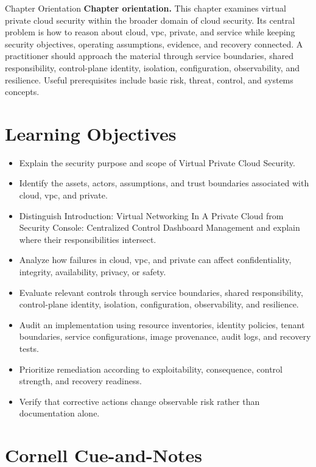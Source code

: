 \documentclass[11pt,letterpaper]{article}
\title{\CornellDocumentTitle}
\author{}
\date{}
\begin{document}
\maketitle
\begin{CornellOverviewBox}{Chapter Orientation}
\textbf{Chapter orientation.} This chapter examines virtual private cloud security within the broader domain of cloud security. Its central problem is how to reason about cloud, vpc, private, and service while keeping security objectives, operating assumptions, evidence, and recovery connected. A practitioner should approach the material through service boundaries, shared responsibility, control-plane identity, isolation, configuration, observability, and resilience. Useful prerequisites include basic risk, threat, control, and systems concepts.
\end{CornellOverviewBox}
\section*{Learning Objectives}
\begin{itemize}
\item Explain the security purpose and scope of Virtual Private Cloud Security.
\item Identify the assets, actors, assumptions, and trust boundaries associated with cloud, vpc, and private.
\item Distinguish Introduction: Virtual Networking In A Private Cloud from Security Console: Centralized Control Dashboard Management and explain where their responsibilities intersect.
\item Analyze how failures in cloud, vpc, and private can affect confidentiality, integrity, availability, privacy, or safety.
\item Evaluate relevant controls through service boundaries, shared responsibility, control-plane identity, isolation, configuration, observability, and resilience.
\item Audit an implementation using resource inventories, identity policies, tenant boundaries, service configurations, image provenance, audit logs, and recovery tests.
\item Prioritize remediation according to exploitability, consequence, control strength, and recovery readiness.
\item Verify that corrective actions change observable risk rather than documentation alone.
\end{itemize}
\section*{Cornell Cue-and-Notes}
\end{document}
